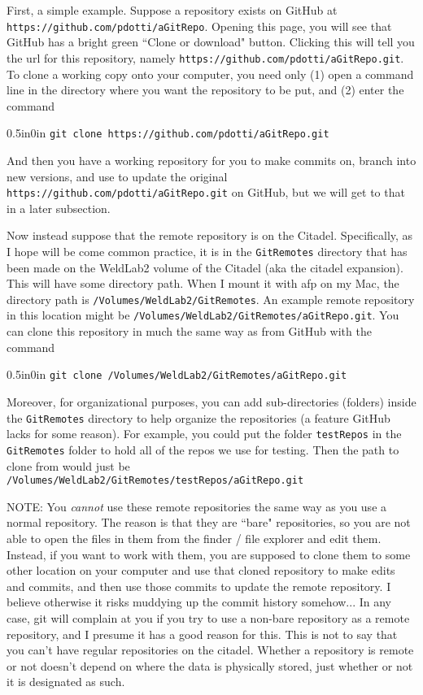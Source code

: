 \documentclass[11pt]{article}
\newcommand{\code}[1]{\begin{adjustwidth}{0.5in}{0in}
    \texttt{#1}
    \end{adjustwidth}}
\begin{document}
First, a simple example.  Suppose a repository exists on GitHub at \texttt{https://github.com/pdotti/aGitRepo}.  Opening this page, you will see that GitHub has a bright green ``Clone or download" button.  Clicking this will tell you the url for this repository, namely \texttt{https://github.com/pdotti/aGitRepo.git}.  To clone a working copy onto your computer, you need only (1) open a command line in the directory where you want the repository to be put, and (2) enter the command

\code{git clone https://github.com/pdotti/aGitRepo.git}

And then you have a working repository for you to make commits on, branch into new versions, and use to update the original \texttt{https://github.com/pdotti/aGitRepo.git} on GitHub, but we will get to that in a later subsection.

Now instead suppose that the remote repository is on the Citadel.  Specifically, as I hope will be come common practice, it is in the \texttt{GitRemotes} directory that has been made on the WeldLab2 volume of the Citadel (aka the citadel expansion).  This will have some directory path.  When I mount it with afp on my Mac, the directory path is \texttt{/Volumes/WeldLab2/GitRemotes}.  An example remote repository in this location might be \texttt{/Volumes/WeldLab2/GitRemotes/aGitRepo.git}.  You can clone this repository in much the same way as from GitHub with the command

\code{git clone /Volumes/WeldLab2/GitRemotes/aGitRepo.git}

Moreover, for organizational purposes, you can add sub-directories (folders) inside the \texttt{GitRemotes} directory to help organize the repositories (a feature GitHub lacks for some reason).  For example, you could put the folder \texttt{testRepos} in the \texttt{GitRemotes} folder to hold all of the repos we use for testing.  Then the path to clone from would just be \texttt{/Volumes/WeldLab2/GitRemotes/testRepos/aGitRepo.git}

NOTE: You \emph{cannot} use these remote repositories the same way as you use a normal repository.  The reason is that they are ``bare" repositories, so you are not able to open the files in them from the finder / file explorer and edit them.  Instead, if you want to work with them, you are supposed to clone them to some other location on your computer and use that cloned repository to make edits and commits, and then use those commits to update the remote repository.  I believe otherwise it risks muddying up the commit history somehow... In any case, git will complain at you if you try to use a non-bare repository as a remote repository, and I presume it has a good reason for this.  This is not to say that you can't have regular repositories on the citadel.  Whether a repository is remote or not doesn't depend on where the data is physically stored, just whether or not it is designated as such.
\end{document}
